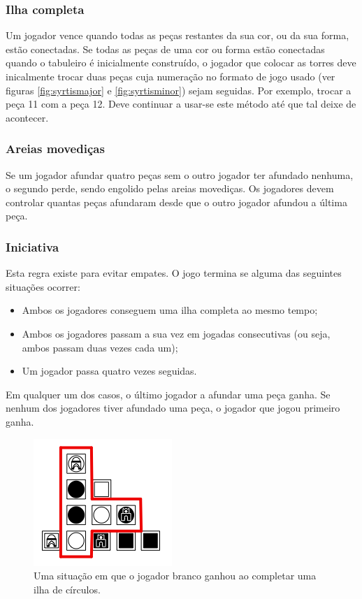 \documentclass[a4paper]{article}
\begin{document}
\subsubsection{Ilha completa}

Um jogador vence quando todas as peças restantes da sua cor, ou da sua forma, estão conectadas.
Se todas as peças de uma cor ou forma estão conectadas quando o tabuleiro é inicialmente construído, o jogador que colocar as torres deve inicalmente trocar duas peças cuja numeração no formato de jogo usado (ver figuras \ref{fig:syrtismajor} e \ref{fig:syrtisminor}) sejam seguidas. Por exemplo, trocar a peça 11 com a peça 12. Deve continuar a usar-se este método até que tal deixe de acontecer.

\subsubsection{Areias movediças}

Se um jogador afundar quatro peças sem o outro jogador ter afundado nenhuma, o segundo perde, sendo engolido pelas areias movediças.
Os jogadores devem controlar quantas peças afundaram desde que o outro jogador afundou a última peça.

\subsubsection{Iniciativa}

Esta regra existe para evitar empates. O jogo termina se alguma das seguintes situações ocorrer:

\begin{itemize}
\item Ambos os jogadores conseguem uma ilha completa ao mesmo tempo;
\item Ambos os jogadores passam a sua vez em jogadas consecutivas (ou seja, ambos passam duas vezes cada um);
\item Um jogador passa quatro vezes seguidas.
\end{itemize}

Em qualquer um dos casos, o último jogador a afundar uma peça ganha. Se nenhum dos jogadores tiver afundado uma peça, o jogador que jogou primeiro ganha.

\begin{figure}[h]
\centering
\includegraphics[scale=0.9]{win.png}
\caption{Uma situação em que o jogador branco ganhou ao completar uma ilha de círculos.}
\label{fig:win}
\end{figure}
\end{document}
